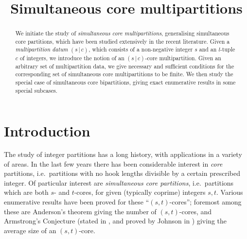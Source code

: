 \documentclass[a4paper, 11pt, twoside]{article}
\begin{document}
\newcommand\see{\diamondsuit}
\newcommand\se[2]{\see_{#1}(#2)}
\newcommand\sof[2]{#1^{(#2)}}
\newcommand\smx{sometimes maximal\xspace}
\newcommand\smn{sometimes minimal\xspace}
\newcommand\mcd{multipartition datum\xspace}
\newcommand\mcds{multipartition data\xspace}
\newcommand\hk[2]{\operatorname{hk}_{#1}(#2)}
\renewcommand\gcd{greatest common divisor\xspace}
\newcommand\gcds{greatest common divisors\xspace}
\newcommand\ngcd{\operatorname{gcd}}
\newcommand\ltup[2]{\left(\left.#1\ \right|\ \smash{#2}\right)}
\newcommand\rtup[2]{\left(\smash{#1}\ \left|\ #2\right.\right)}
\newcommand\weyl{\tilde{\mathfrak S}_}
\newcommand\be[1]{\mathcal{B}^{#1}}
\newcommand\ber[2]{\be{#1}_{#2}}
\newcommand\berm[2]{\be{#1}_{-#2}}
\newcommand\cores[1]{\calc_{#1}}
\newcommand\zsz{\bbz/s\bbz}
\newcommand\zgz{\bbz/g\bbz}
\newcommand\bc[2]{\mc{#1}{0,#2}}
\newcommand\mc[2]{\mathcal{C}_{(#1\,|\,#2)}}
\newcommand\smc[1]{\mathcal{C}_{#1}}
\newcommand\cpt[2]{#1^{(#2)}}

\title{Simultaneous core multipartitions}

\toptitle

\begin{abstract}
We initiate the study of \emph{simultaneous core multipartitions}, generalising simultaneous core partitions, which have been studied extensively in the recent literature. Given a \emph{multipartition datum} $(s\,|\,c)$, which consists of a non-negative integer $s$ and an $l$-tuple $c$ of integers, we introduce the notion of an $(s\,|\,c)$-core multipartition. Given an arbitrary set of \mcds, we give necessary and sufficient conditions for the corresponding set of simultaneous core multipartitions to be finite. We then study the special case of simultaneous core bipartitions, giving exact enumerative results in some special subcases.
\end{abstract}

\section{Introduction}

The study of integer partitions has a long history, with applications in a variety of areas. In the last few years there has been considerable interest in \emph{core} partitions, i.e.\ partitions with no hook lengths divisible by a certain prescribed integer. Of particular interest are \emph{simultaneous core partitions}, i.e.\ partitions which are both $s$- and $t$-cores, for given (typically coprime) integers $s,t$. Various enumerative results have been proved for these ``$(s,t)$-cores''; foremost among these are Anderson's theorem \cite{and} giving the number of $(s,t)$-cores, and Armstrong's Conjecture (stated in \cite{ahj}, and proved by Johnson in \cite{j}) giving the average size of an $(s,t)$-core.
\end{document}
